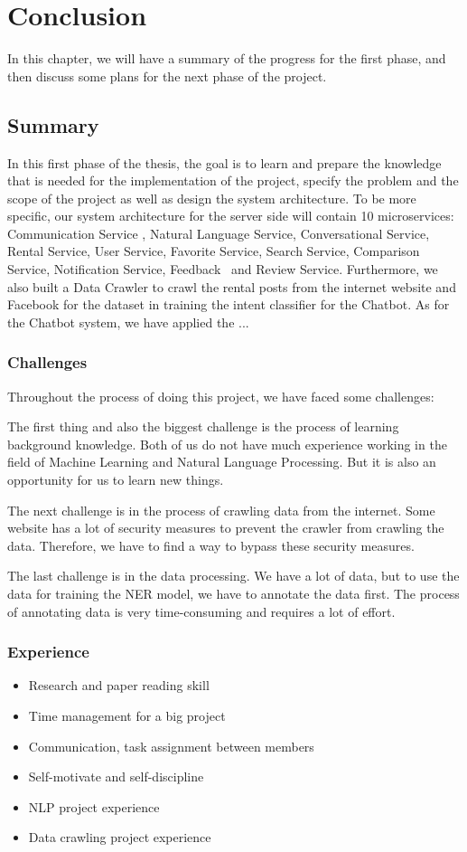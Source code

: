 \chapter{Conclusion}
In this chapter, we will have a summary of the progress for the first phase, and then discuss some plans for the next phase of the project.

\section{Summary}
In this first phase of the thesis, the goal is to learn and prepare the knowledge that is needed for the implementation of the project, specify the problem and the scope of the project as well as design the system architecture. To be more specific, our system architecture for the server side will contain 10 microservices: Communication Service 
, Natural Language Service, Conversational Service, Rental Service, User Service, Favorite Service, Search Service, Comparison Service, Notification Service, Feedback \ and Review Service. Furthermore, we also built a Data Crawler to crawl the rental posts from the internet website and Facebook for the dataset in training the intent classifier for the Chatbot. As for the Chatbot system, we have applied the ...

\subsection{Challenges}
Throughout the process of doing this project, we have faced some challenges:

The first thing and also the biggest challenge is the process of learning background knowledge. Both of us do not have much experience working in the field of Machine Learning and Natural Language Processing. But it is also an opportunity for us to learn new things. 

The next challenge is in the process of crawling data from the internet. Some website has a lot of security measures to prevent the crawler from crawling the data. Therefore, we have to find a way to bypass these security measures.

The last challenge is in the data processing. We have a lot of data, but to use the data for training the NER model, we have to annotate the data first. The process of annotating data is very time-consuming and requires a lot of effort.

\subsection{Experience}
\begin{itemize}
    \item Research and paper reading skill
    \item Time management for a big project
    \item Communication, task assignment between members
    \item Self-motivate and self-discipline
    \item NLP project experience
    \item Data crawling project experience
\end{itemize}

